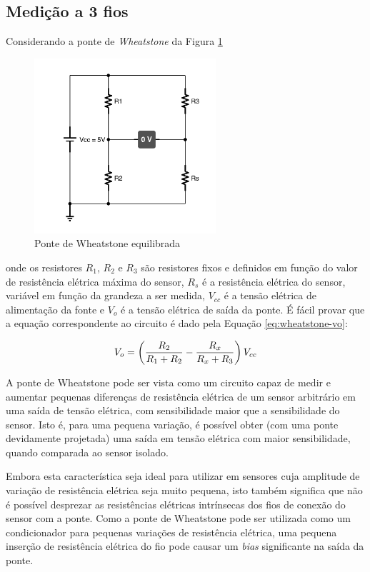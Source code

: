 \documentclass[a4paper]{instrumentacao}
\begin{document}
\subsection{Medição a 3 fios}

Considerando a ponte de \textit{Wheatstone} da Figura \ref{fig:3fios-wheatstone}

\begin{figure}[H]
\centering
\includegraphics[width=0.6\textwidth]{Wheatstone-Bridge.pdf}
\caption{Ponte de Wheatstone equilibrada}
\label{fig:3fios-wheatstone}
\end{figure}

\noindent onde os resistores $R_1$, $R_2$ e $R_3$ são resistores fixos e definidos em função do valor de resistência elétrica máxima do sensor, $R_s$ é a resistência elétrica do sensor, variável em função da grandeza a ser medida, $V_{cc}$ é a tensão elétrica de alimentação da fonte e $V_o$ é a tensão elétrica de saída da ponte. É fácil provar que a equação correspondente ao circuito é dado pela Equação \ref{eq:wheatstone-vo}:

\begin{equation}
	V_o = \left({{R_2}\over{R_1 + R_2}} - {{R_x}\over{R_x + R_3}}\right)V_{cc}
	\label{eq:wheatstone-vo}
\end{equation}

A ponte de Wheatstone pode ser vista como um circuito capaz de medir e aumentar pequenas diferenças de resistência elétrica de um sensor arbitrário em uma saída de tensão elétrica, com sensibilidade maior que a sensibilidade do sensor. Isto é, para uma pequena variação, é possível obter (com uma ponte devidamente projetada) uma saída em tensão elétrica com maior sensibilidade, quando comparada ao sensor isolado.

Embora esta característica seja ideal para utilizar em sensores cuja amplitude de variação de resistência elétrica seja muito pequena, isto também significa que não é possível desprezar as resistências elétricas intrínsecas dos fios de conexão do sensor com a ponte. Como a ponte de Wheatstone pode ser utilizada como um condicionador para pequenas variações de resistência elétrica, uma pequena inserção de resistência elétrica do fio pode causar um \textit{bias} significante na saída da ponte.
\end{document}
